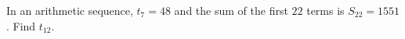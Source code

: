 In an arithmetic sequence, $t_7=48$ and the sum of the first $22$ terms is $S_{22}=1551$. Find $t_{12}$.
